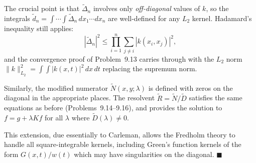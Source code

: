 \documentclass[12pt]{article}
\begin{document}
The crucial point is that $\tilde{\Delta}_n$ involves only \emph{off-diagonal} values of $k$, so the integrals $\tilde{d}_n = \int\cdots\int \tilde{\Delta}_n\,dx_1\cdots dx_n$ are well-defined for any $L_2$ kernel. Hadamard's inequality still applies:
\[
|\tilde{\Delta}_n|^2 \le \prod_{i=1}^n \sum_{j \neq i} |k(x_i, x_j)|^2,
\]
and the convergence proof of Problem~9.13 carries through with the $L_2$ norm $\|k\|_{L_2}^2 = \int\!\!\int |k(x,t)|^2\,dx\,dt$ replacing the supremum norm.

Similarly, the modified numerator $\tilde{N}(x,y;\lambda)$ is defined with zeros on the diagonal in the appropriate places. The resolvent $\tilde{R} = \tilde{N}/\tilde{D}$ satisfies the same equations as before (Problems~9.14--9.16), and provides the solution to $f = g + \lambda Kf$ for all $\lambda$ where $\tilde{D}(\lambda) \neq 0$.

This extension, due essentially to Carleman, allows the Fredholm theory to handle all square-integrable kernels, including Green's function kernels of the form $G(x,t)/w(t)$ which may have singularities on the diagonal. \hfill $\blacksquare$
\end{document}
